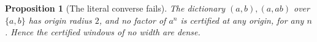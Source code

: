 \documentclass[11pt,a4paper]{article}
\theoremstyle{definition}
\theoremstyle{plain}
\newtheorem{proposition}{Proposition}
\begin{document}

\begin{proposition}[The literal converse fails]\label{prop:converse}
The dictionary \((a, b), (a, ab)\) over \(\{a, b\}\) has origin radius \(2\), and no factor of \(a^n\) is certified at
any origin, for any \(n\). Hence the certified windows of no width are dense.
\end{proposition}
\end{document}
